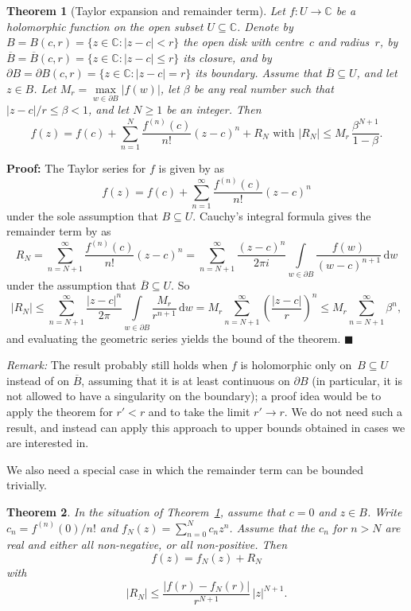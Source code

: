 \documentclass [11pt]{article}
\newcommand {\C}{\mathbb C}
\renewcommand {\leq}{\leqslant}
\renewcommand {\geq}{\geqslant}
\newcommand {\diff}{\mathrm {d}}
\newtheorem{theorem}{Theorem}
\newenvironment{proof}{\noindent \textbf {Proof:}}{{\hspace* {\fill}$\blacksquare$}}
\newenvironment{remark}{\noindent \textit {Remark:}}{}
\begin{document}
\begin {theorem}[Taylor expansion and remainder term]
\label {th:taylor}
Let $f : U \to \C$ be a holomorphic function on the open subset
$U \subseteq \C$. Denote by $B = B (c, r) = \{ z \in \C : |z - c| < r \}$
the open disk with centre~$c$ and radius~$r$, by
$\overline B = \overline B (c, r) = \{ z \in \C : |z - c| \leq r \}$
its closure, and by
$\partial B = \partial B (c, r) = \{ z \in \C : |z - c| = r \}$
its boundary. Assume that $\overline B \subseteq U$, and let $z \in B$.
Let $M_r = \max\limits_{w \in \partial B} |f (w)|$,
let $\beta$ be any real number such that $|z - c| / r \leq \beta < 1$,
and let $N \geq 1$ be an integer. Then
\[
f (z) = f (c) + \sum_{n = 1}^N \frac {f^{(n)} (c)}{n!} (z - c)^n + R_N
\text { with }
|R_N| \leq M_r \, \frac {\beta^{N + 1}}{1 - \beta}.
\]
\end {theorem}
\begin {proof}
The Taylor series for $f$ is given by \cite [Theorem~16-8]{Apostol57} as
\[
f (z) = f (c) + \sum_{n = 1}^\infty \frac {f^{(n)} (c)}{n!} (z - c)^n
\]
under the sole assumption that $B \subseteq U$.
Cauchy's integral formula gives the remainder term by
\cite [Theorem~16-7]{Apostol57} as
\[
R_N = \sum_{n = N+1}^\infty \frac {f^{(n)} (c)}{n!} (z - c)^n
= \sum_{n = N+1}^\infty \frac {(z - c)^n}{2 \pi i}
\int\limits_{w \in \partial B} \frac {f (w)}{(w - c)^{n+1}} \, \diff w
\]
under the assumption that $\overline B \subseteq U$.
So
\[
|R_N| \leq \sum_{n = N+1}^\infty \frac {|z - c|^n}{2 \pi}
\int\limits_{w \in \partial B} \frac {M_r}{r^{n+1}} \, \diff w
= M_r \sum_{n = N+1}^\infty \left( \frac {|z - c|}{r} \right)^n
\leq M_r \sum_{n = N+1}^\infty \beta^n,
\]
and evaluating the geometric series yields the bound of the theorem.
\end {proof}

\begin {remark}
The result probably still holds when $f$ is holomorphic only
on~$B \subseteq U$ instead of on $\overline B$, assuming that it is at
least continuous on $\partial B$ (in particular, it is not allowed to have
a singularity on the boundary); a proof idea would be to apply the theorem
for $r' < r$ and to take the limit $r' \to r$.
We do not need such a result, and instead can apply this approach to upper
bounds obtained in cases we are interested in.
\end {remark}

We also need a special case in which the remainder term can be bounded
trivially.

\begin {theorem}
\label {th:taylorpositive}
In the situation of Theorem~\ref {th:taylor}, assume that $c = 0$ and
$z \in B$. Write
$c_n = f^{(n)} (0) / n!$ and
$f_N (z) = \sum_{n=0}^N c_n z^n$.
Assume that the $c_n$ for $n > N$ are real and either all non-negative,
or all non-positive. Then
\[
f (z) = f_N (z) + R_N
\]
with
\[
|R_N| \leq \frac {|f (r) - f_N (r)|}{r^{N+1}} \, |z|^{N+1}.
\]
\end {theorem}
\end{document}
